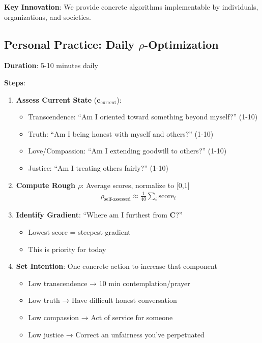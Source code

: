 \documentclass[11pt,a4paper]{article}
\theoremstyle{definition}
\theoremstyle{remark}
\newcommand{\cc}{\mathbf{c}}
\begin{document}
\begin{small}
\begin{enumerate}
\begin{mdframed}[backgroundcolor=cyan!5,linewidth=2pt]
\textbf{Key Innovation}: We provide concrete algorithms implementable by individuals, organizations, and societies.
\end{mdframed}

\subsection{Personal Practice: Daily \(\rho\)-Optimization}

\begin{protocol}
\textbf{Duration}: 5-10 minutes daily

\textbf{Steps}:
\begin{enumerate}
    \item \textbf{Assess Current State} (\(\cc_{\text{current}}\)):
        \begin{itemize}[nosep]
            \item Transcendence: ``Am I oriented toward something beyond myself?'' (1-10)
            \item Truth: ``Am I being honest with myself and others?'' (1-10)
            \item Love/Compassion: ``Am I extending goodwill to others?'' (1-10)
            \item Justice: ``Am I treating others fairly?'' (1-10)
        \end{itemize}
    
    \item \textbf{Compute Rough \(\rho\)}: Average scores, normalize to [0,1]
    \begin{align}
    \rho_{\text{self-assessed}} \approx \frac{1}{40}\sum_i \text{score}_i
    \end{align}
    
    \item \textbf{Identify Gradient}: ``Where am I furthest from \(\mathbf{C}\)?''
        \begin{itemize}[nosep]
            \item Lowest score = steepest gradient
            \item This is priority for today
        \end{itemize}
    
    \item \textbf{Set Intention}: One concrete action to increase that component
        \begin{itemize}[nosep]
            \item Low transcendence → 10 min contemplation/prayer
            \item Low truth → Have difficult honest conversation
            \item Low compassion → Act of service for someone
            \item Low justice → Correct an unfairness you've perpetuated
        \end{itemize}
    

\end{enumerate}
\end{protocol}
\end{enumerate}
\end{small}
\end{document}
